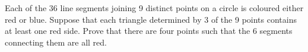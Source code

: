 Each of the 36 line segments joining 9 distinct points on a circle is coloured either red or blue. Suppose that each triangle determined by 3 of the 9 points contains at least one red side. Prove that there are four points such that the 6 segments connecting them are all red.